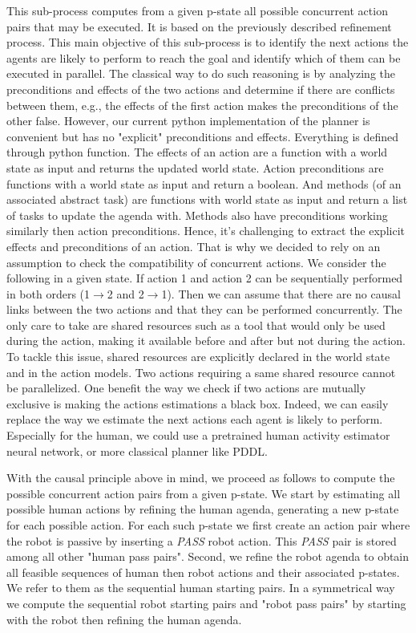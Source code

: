 This sub-process computes from a given p-state all possible concurrent action pairs that may be executed. It is based on the previously described refinement process. This main objective of this sub-process is to identify the next actions the agents are likely to perform to reach the goal and identify which of them can be executed in parallel. The classical way to do such reasoning is by analyzing the preconditions and effects of the two actions and determine if there are conflicts between them, e.g., the effects of the first action makes the preconditions of the other false.
However, our current python implementation of the planner is convenient but has no "explicit" preconditions and effects. Everything is defined through python function. The effects of an action are a function with a world state as input and returns the updated world state. Action preconditions are functions with a world state as input and return a boolean. And methods (of an associated abstract task) are functions with world state as input and return a list of tasks to update the agenda with. Methods also have preconditions working similarly then action preconditions. 
Hence, it's challenging to extract the explicit effects and preconditions of an action. That is why we decided to rely on an assumption to check the compatibility of concurrent actions. 
We consider the following in a given state. 
If action 1 and action 2 can be sequentially performed in both orders (1$\rightarrow$2 and 2$\rightarrow$1). Then we can assume that there are no causal links between the two actions and that they can be performed concurrently. The only care to take are shared resources such as a tool that would only be used during the action, making it available before and after but not during the action. To tackle this issue, shared resources are explicitly declared in the world state and in the action models. Two actions requiring a same shared resource cannot be parallelized.
One benefit the way we check if two actions are mutually exclusive is making the actions estimations a black box. Indeed, we can easily replace the way we estimate the next actions each agent is likely to perform. Especially for the human, we could use a pretrained human activity estimator neural network, or more classical planner like PDDL. 

With the causal principle above in mind, we proceed as follows to compute the possible concurrent action pairs from a given p-state. We start by estimating all possible human actions by refining the human agenda, generating a new p-state for each possible action. For each such p-state we first create an action pair where the robot is passive by inserting a \textit{PASS} robot action. This \textit{PASS} pair is stored among all other "human pass pairs". Second, we refine the robot agenda to obtain all feasible sequences of human then robot actions and their associated p-states. We refer to them as the sequential human starting pairs. In a symmetrical way we compute the sequential robot starting pairs and "robot pass pairs" by starting with the robot then refining the human agenda.

